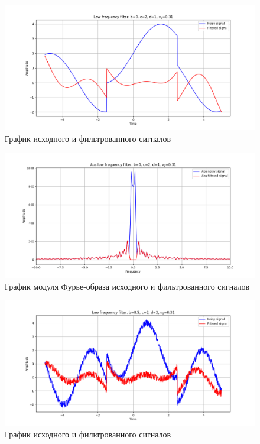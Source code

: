 \documentclass[a4paper, 12pt]{article}
\begin{document}
    \begin{figure}[!htb]
        \centering
        \includegraphics[scale=0.485]{16_u_flt_u_nolow.png}
        \captionsetup{skip=0pt}
        \caption{График исходного и фильтрованного сигналов}
        \label{fig:fig57}
    \end{figure}
    \begin{figure}[!htb]
        \centering
        \includegraphics[scale=0.485]{16_abs_u_U_nolow.png}
        \captionsetup{skip=0pt}
        \caption{График модуля Фурье-образа исходного и фильтрованного сигналов}
        \label{fig:fig58}
    \end{figure}
    \begin{figure}[!htb]
        \centering
        \includegraphics[scale=0.485]{17_u_flt_u_nolow.png}
        \captionsetup{skip=0pt}
        \caption{График исходного и фильтрованного сигналов}
        \label{fig:fig59}
    \end{figure}
\end{document}
